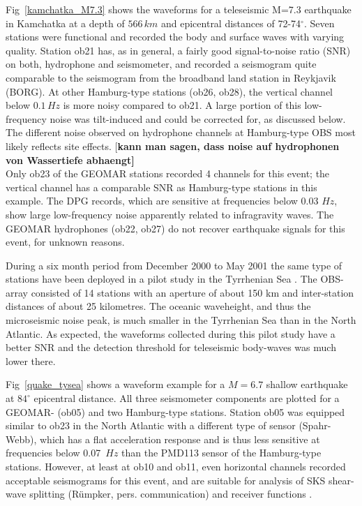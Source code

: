 \documentclass{article}
\providecommand{\remark}[1]{{[\bf #1]}}
\begin{document}
{Fig~\ref{kamchatka_M7.3}
shows the waveforms for a teleseismic M=7.3 earthquake in 
Kamchatka at a depth of $566\, km$ 
and epicentral distances of 72-74$^\circ$.
Seven stations were functional and recorded the body and surface waves 
with varying quality.
Station ob21 has, as in general, a fairly good signal-to-noise ratio
(SNR) on both, hydrophone and seismometer, 
and recorded a seismogram quite comparable to the seismogram from the 
broadband land station in Reykjavik (BORG).
At other Hamburg-type stations (ob26, ob28), the vertical channel below $0.1\, Hz$ 
is more noisy compared to ob21.
A large portion of this low-frequency noise was tilt-induced and could be 
corrected for, as discussed below.
The different noise observed on hydrophone channels at Hamburg-type 
OBS most likely reflects site effects.
\remark{kann man sagen, dass noise auf hydrophonen von Wassertiefe abhaengt}
\\
Only ob23 of the GEOMAR stations recorded 4 channels for this event; 
the vertical channel has a comparable SNR  as Hamburg-type stations 
in this example.
The DPG records, which are sensitive at frequencies below 0.03 $Hz$, 
show large low-frequency noise apparently related to infragravity waves.
The GEOMAR hydrophones (ob22, ob27) do not recover 
earthquake signals for this event, for unknown reasons.

During a six month period from December 2000 to May 2001 
the same type of stations have been deployed in a pilot study 
in the Tyrrhenian Sea
\cite[e.g.][]{dahm:02}.
The OBS-array consisted of 14 stations with an aperture of about 
150 km and inter-station distances of about 25 kilometres.
The oceanic waveheight, and thus the microseismic noise peak, is much smaller
in the Tyrrhenian Sea than in the North Atlantic. 
As expected, the waveforms collected during this pilot study 
have a better SNR and the detection threshold for teleseismic body-waves
was much lower there.

Fig~\ref{quake_tysea}
shows a waveform example for a $M=6.7$ shallow earthquake at
$84^{\circ}$ epicentral distance.
All three seismometer components are plotted for a GEOMAR- (ob05) and 
two Hamburg-type stations.
Station ob05 was equipped similar to ob23 in the North Atlantic 
with a  different type of sensor
(Spahr-Webb), which 
has a flat acceleration response and is thus less sensitive 
at frequencies below
0.07~$Hz$ than the PMD113 sensor of the Hamburg-type stations. 
However, at least at ob10 and ob11, even horizontal channels 
recorded acceptable seismograms for this event, 
and are suitable for analysis of SKS shear-wave splitting 
(R\"umpker, pers. communication)
and receiver functions \cite[and pers. communication]{thorwart:04}.

}
\end{document}
